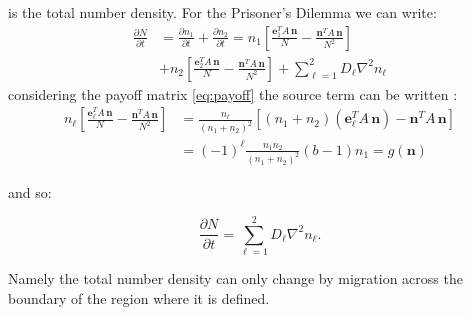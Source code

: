 is the total number density. For the Prisoner's Dilemma we can write:
\begin{align*}
\frac{\partial N}{\partial t} & =\frac{\partial n_{1}}{\partial t}+\frac{\partial n_{2}}{\partial t}=n_{1}\left[\frac{\mathbf{e}_{1}^{T}A\,\mathbf{n}}{N}-\frac{\mathbf{n}^{T}A\,\mathbf{n}}{N^{2}}\right]\\
 & +n_{2}\left[\frac{\mathbf{e}_{2}^{T}A\,\mathbf{n}}{N}-\frac{\mathbf{n}^{T}A\,\mathbf{n}}{N^{2}}\right]+\sum_{\ell=1}^{2}D_{\ell}\nabla^{2}n_{\ell}
\end{align*}
considering the payoff matrix \ref{eq:payoff} the source term can
be written \cite{amadori_one_2010}:
\begin{align}
n_{\ell}\left[\frac{\mathbf{e}_{\ell}^{T}A\,\mathbf{n}}{N}-\frac{\mathbf{n}^{T}A\,\mathbf{n}}{N^{2}}\right] & =\frac{n_{\ell}}{\left(n_{1}+n_{2}\right)^{2}}\left[\left(n_{1}+n_{2}\right)\left(\mathbf{e}_{\ell}^{T}A\,\mathbf{n}\right)-\mathbf{n}^{T}A\,\mathbf{n}\right]\nonumber \\
 & =\left(-1\right)^{\ell}\frac{n_{1}n_{2}}{\left(n_{1}+n_{2}\right)^{2}}\left(b-1\right)n_{1}=g\left(\mathbf{n}\right)\label{eq:source}
\end{align}

and so:

\noindent 
\begin{equation}
\frac{\partial N}{\partial t}=\sum_{\ell=1}^{2}D_{\ell}\nabla^{2}n_{\ell}.\label{eq:N_vick}
\end{equation}

Namely the total number density can only change by migration across
the boundary of the region where it is defined.


